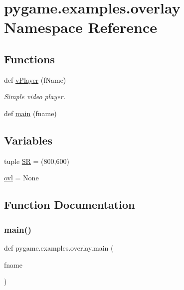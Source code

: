 \hypertarget{namespacepygame_1_1examples_1_1overlay}{}\section{pygame.\+examples.\+overlay Namespace Reference}
\label{namespacepygame_1_1examples_1_1overlay}
\subsection*{Functions}
\begin{DoxyCompactItemize}
\item 
def \hyperlink{namespacepygame_1_1examples_1_1overlay_a2a27feabec4506b63cdc068e52491a8b}{v\+Player} (f\+Name)
\begin{DoxyCompactList}\small\item\em Simple video player. \end{DoxyCompactList}\item 
def \hyperlink{namespacepygame_1_1examples_1_1overlay_ac8777d347809357ae23cf594ebb1b64d}{main} (fname)
\end{DoxyCompactItemize}
\subsection*{Variables}
\begin{DoxyCompactItemize}
\item 
tuple \hyperlink{namespacepygame_1_1examples_1_1overlay_a820f6f4cc819ee3519946a7f8f298f94}{SR} = (800,600)
\item 
\hyperlink{namespacepygame_1_1examples_1_1overlay_a00fb92a4ee80be3370747b62136966f0}{ovl} = None
\end{DoxyCompactItemize}


\subsection{Function Documentation}
\mbox{\label{namespacepygame_1_1examples_1_1overlay_ac8777d347809357ae23cf594ebb1b64d}} 
\subsubsection{\texorpdfstring{main()}{main()}}
{\footnotesize\ttfamily def pygame.\+examples.\+overlay.\+main (\begin{DoxyParamCaption}\item[{}]{fname }\end{DoxyParamCaption})}

